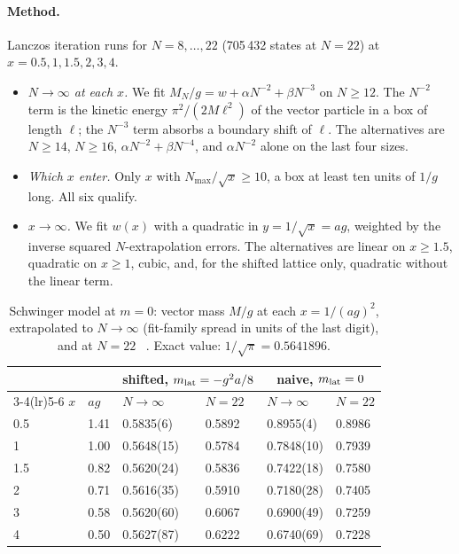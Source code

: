 \paragraph{Method.} Lanczos iteration runs for $N=8,\dots,22$ (705\,432 states at $N=22$) at $x=0.5,1,1.5,2,3,4$.
\begin{itemize}[nosep]
\item \emph{$N\to\infty$ at each $x$.} We fit $M_N/g=w+\alpha N^{-2}+\beta N^{-3}$ on $N\ge12$. The $N^{-2}$ term is the kinetic energy
$\pi^2/(2M\ell^2)$ of the vector particle in a box of length $\ell$; the $N^{-3}$ term absorbs a boundary shift of $\ell$. The alternatives
are $N\ge14$, $N\ge16$, $\alpha N^{-2}+\beta N^{-4}$, and $\alpha N^{-2}$ alone on the last four sizes.
\item \emph{Which $x$ enter.} Only $x$ with $N_{\max}/\sqrt x\ge10$, a box at least ten units of $1/g$ long. All six qualify.
\item \emph{$x\to\infty$.} We fit $w(x)$ with a quadratic in $y=1/\sqrt x=ag$, weighted by the inverse squared $N$-extrapolation
errors. The alternatives are linear on $x\ge1.5$, quadratic on $x\ge1$, cubic, and, for the shifted lattice only, quadratic without the
linear term.
\end{itemize}

\begin{table}[htb]\centering\footnotesize
\caption{Schwinger model at $m=0$: vector mass $M/g$ at each $x=1/(ag)^2$, extrapolated to $N\to\infty$ (fit-family spread in units of
the last digit), and at $N=22$ \tagS~. Exact value: $1/\sqrt\pi=0.5641896$.}\label{tab:hosted:schwinger}
\begin{tabular}{@{}llllll@{}}
\toprule
& & \multicolumn{2}{c}{shifted, $m_{\rm lat}=-g^2a/8$} & \multicolumn{2}{c}{naive, $m_{\rm lat}=0$}\\
\cmidrule(lr){3-4}\cmidrule(lr){5-6}
$x$ & $ag$ & $N\to\infty$ & $N=22$ & $N\to\infty$ & $N=22$\\
\midrule
0.5 & 1.41 & 0.5835(6) & 0.5892 & 0.8955(4) & 0.8986\\
1 & 1.00 & 0.5648(15) & 0.5784 & 0.7848(10) & 0.7939\\
1.5 & 0.82 & 0.5620(24) & 0.5836 & 0.7422(18) & 0.7580\\
2 & 0.71 & 0.5616(35) & 0.5910 & 0.7180(28) & 0.7405\\
3 & 0.58 & 0.5620(60) & 0.6067 & 0.6900(49) & 0.7259\\
4 & 0.50 & 0.5627(87) & 0.6222 & 0.6740(69) & 0.7228\\
\bottomrule
\end{tabular}
\end{table}

